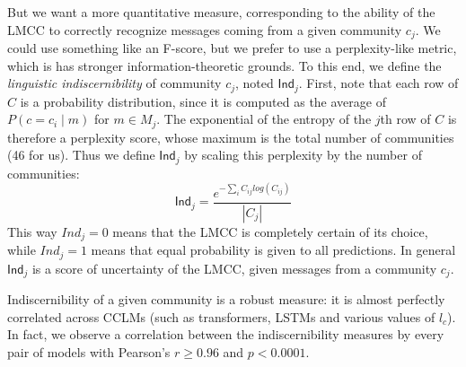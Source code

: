 \documentclass[11pt]{article}
\newcommand\Ind{\mathsf{Ind}}
\begin{document}
But we want a more quantitative measure, corresponding to the ability of the LMCC to correctly
recognize messages coming from a given community $c_j$. We could use
something like an F-score, but we prefer to use a perplexity-like metric,
which is has stronger information-theoretic grounds.
To this end, we define the \emph{linguistic indiscernibility} of community $c_j$, 
noted $\Ind_j$. 
First, note that each row of $C$ is a probability distribution,
since it is computed as the average of $P(c=c_i \mid m)$ for $m\in M_j$.
The exponential of the entropy of the $j$th row of \(C\) is therefore a perplexity score,
whose maximum is the total number of communities (46 for us).
Thus we define $\Ind_j$ by scaling this perplexity by the number of communities:
\[\Ind_j = \frac{e^{-\sum_i C_{ij} log(C_{ij})}}{|C_j|}\]
This way $Ind_j=0$ means that the LMCC is completely certain of its
choice, while $Ind_j=1$ means that equal probability is given to all
predictions.  In general $\Ind_j$ is a score of uncertainty of the
LMCC, given messages from a community $c_j$.

Indiscernibility of a given community is a robust measure: it is
almost perfectly correlated across CCLMs (such as transformers, LSTMs
and various values of $l_c$).  In fact, we observe a correlation
between the indiscernibility measures by every pair of models with
Pearson's $r \geq 0.96$ and $p < 0.0001$. 
\end{document}
